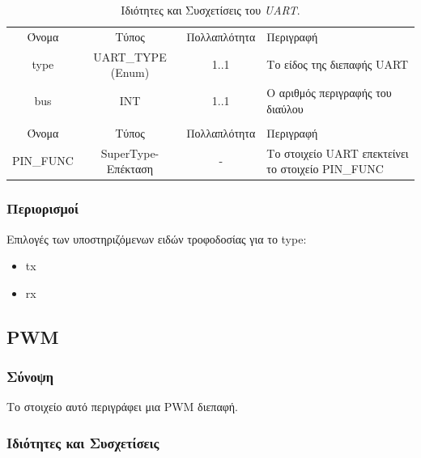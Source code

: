 \begin{table}[H]
	\begin{center}
		\begin{tabular}{ | c | c | c| m{5.5cm} | }
			\hline
			\rowcolor{Gray}
			\multicolumn{4}{|c|}{\textbf{Ιδιότητες}}\\
			\hline
			\rowcolor{Gray}
			Όνομα & Τύπος & Πολλαπλότητα & Περιγραφή \\
			\hline
			type & UART\_TYPE (Enum) & 1..1 & Το είδος της διεπαφής UART \\
			\hline
			bus & INT & 1..1 & Ο αριθμός περιγραφής του διαύλου \\
			\hline
			\rowcolor{Gray}
			\multicolumn{4}{|c|}{\textbf{Συσχετίσεις}}\\
			\hline
			\rowcolor{Gray}
			Όνομα & Τύπος & Πολλαπλότητα & Περιγραφή \\
			\hline
			PIN\_FUNC & SuperType-Επέκταση & - &  Το στοιχείο UART επεκτείνει το στοιχείο PIN\_FUNC \\
			\hline
		\end{tabular}
		\caption{Ιδιότητες και Συσχετίσεις του \textit{UART}.}
		\label{tab:uart}
	\end{center}
\end{table}

\subsubsection*{Περιορισμοί}

\noindent Επιλογές των υποστηριζόμενων ειδών τροφοδοσίας για το type:

\begin{itemize}
	\item tx
	\item rx
\end{itemize}

\subsection{PWM}
\label{subsec:pwm}

\subsubsection*{Σύνοψη}

\noindent Το στοιχείο αυτό περιγράφει μια PWM διεπαφή.

\subsubsection*{Ιδιότητες και Συσχετίσεις}

